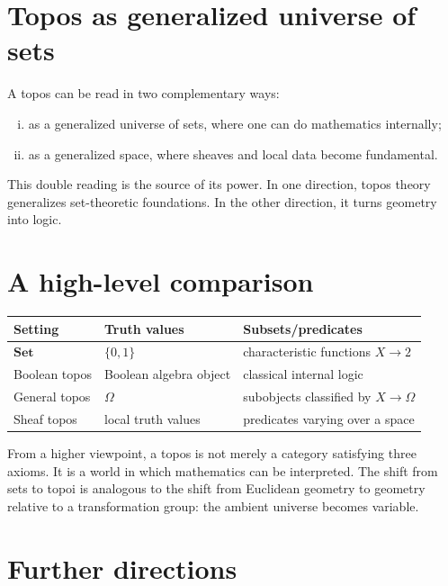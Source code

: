 \section{Topos as generalized universe of sets}

A topos can be read in two complementary ways:
\begin{enumerate}[(i)]
  \item as a generalized universe of sets, where one can do mathematics internally;
  \item as a generalized space, where sheaves and local data become fundamental.
\end{enumerate}

This double reading is the source of its power.  In one direction, topos theory generalizes set-theoretic foundations.  In the other direction, it turns geometry into logic.

\section{A high-level comparison}

\begin{center}
\begin{tabular}{lll}
\toprule
Setting & Truth values & Subsets/predicates\\
\midrule
\(\mathbf{Set}\) & \(\{0,1\}\) & characteristic functions \(X\to2\)\\
Boolean topos & Boolean algebra object & classical internal logic\\
General topos & \(\Omega\) & subobjects classified by \(X\to\Omega\)\\
Sheaf topos & local truth values & predicates varying over a space\\
\bottomrule
\end{tabular}
\end{center}

\begin{remark}
From a higher viewpoint, a topos is not merely a category satisfying three axioms.  It is a world in which mathematics can be interpreted.  The shift from sets to topoi is analogous to the shift from Euclidean geometry to geometry relative to a transformation group: the ambient universe becomes variable.
\end{remark}

\section{Further directions}

